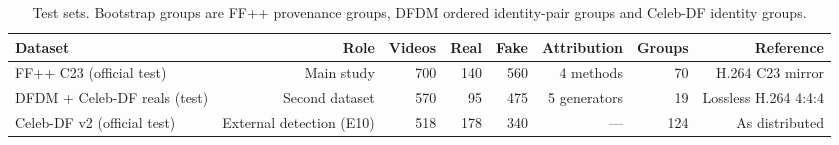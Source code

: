 \begin{table}[t]
\centering
\footnotesize
\caption{Test sets. Bootstrap groups are FF++ provenance groups, DFDM ordered identity-pair groups and Celeb-DF identity groups.}
\label{tab:datasets}
\setlength{\tabcolsep}{3.5pt}
\begin{tabular}{lrrrrrrr}
\toprule
Dataset & Role & Videos & Real & Fake & Attribution & Groups & Reference \\
\midrule
FF++ C23 (official test) & Main study & 700 & 140 & 560 & 4 methods & 70 & H.264 C23 mirror \\
DFDM + Celeb-DF reals (test) & Second dataset & 570 & 95 & 475 & 5 generators & 19 & Lossless H.264 4:4:4 \\
Celeb-DF v2 (official test) & External detection (E10) & 518 & 178 & 340 & — & 124 & As distributed \\
\bottomrule
\end{tabular}
\end{table}
